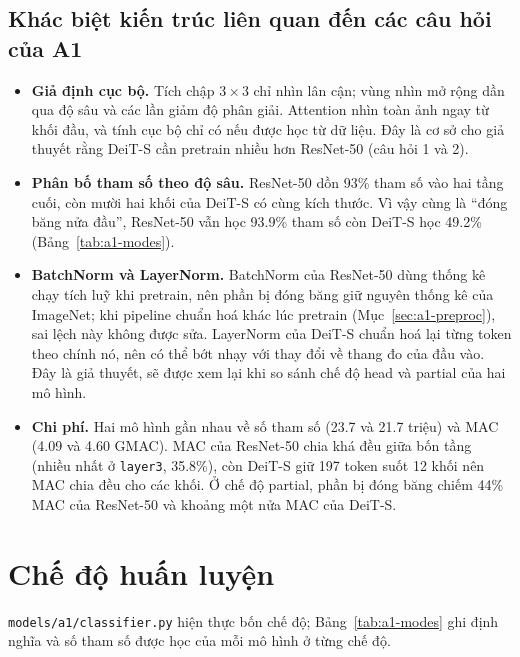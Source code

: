 \subsection{Khác biệt kiến trúc liên quan đến các câu hỏi của A1}
\begin{itemize}
\item \textbf{Giả định cục bộ.} Tích chập \(3\times3\) chỉ nhìn lân cận; vùng nhìn mở rộng dần qua độ sâu và các lần giảm độ phân giải. Attention nhìn toàn ảnh ngay từ khối đầu, và tính cục bộ chỉ có nếu được học từ dữ liệu. Đây là cơ sở cho giả thuyết rằng DeiT-S cần pretrain nhiều hơn ResNet-50 (câu hỏi 1 và 2).
\item \textbf{Phân bố tham số theo độ sâu.} ResNet-50 dồn 93\% tham số vào hai tầng cuối, còn mười hai khối của DeiT-S có cùng kích thước. Vì vậy cùng là ``đóng băng nửa đầu'', ResNet-50 vẫn học 93.9\% tham số còn DeiT-S học 49.2\% (Bảng~\ref{tab:a1-modes}).
\item \textbf{BatchNorm và LayerNorm.} BatchNorm của ResNet-50 dùng thống kê chạy tích luỹ khi pretrain, nên phần bị đóng băng giữ nguyên thống kê của ImageNet; khi pipeline chuẩn hoá khác lúc pretrain (Mục~\ref{sec:a1-preproc}), sai lệch này không được sửa. LayerNorm của DeiT-S chuẩn hoá lại từng token theo chính nó, nên có thể bớt nhạy với thay đổi về thang đo của đầu vào. Đây là giả thuyết, sẽ được xem lại khi so sánh chế độ head và partial của hai mô hình.
\item \textbf{Chi phí.} Hai mô hình gần nhau về số tham số (23.7 và 21.7 triệu) và MAC (4.09 và 4.60 GMAC). MAC của ResNet-50 chia khá đều giữa bốn tầng (nhiều nhất ở \texttt{layer3}, 35.8\%), còn DeiT-S giữ 197 token suốt 12 khối nên MAC chia đều cho các khối. Ở chế độ partial, phần bị đóng băng chiếm 44\% MAC của ResNet-50 và khoảng một nửa MAC của DeiT-S.
\end{itemize}

\section{Chế độ huấn luyện}\label{sec:a1-modes}
\texttt{models/a1/classifier.py} hiện thực bốn chế độ; Bảng~\ref{tab:a1-modes} ghi định nghĩa và số tham số được học của mỗi mô hình ở từng chế độ.

